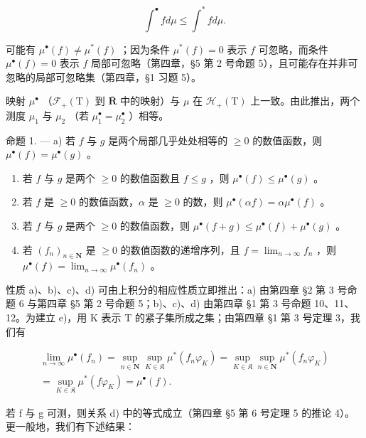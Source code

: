 \[
\int^ {\bullet} f d \mu \leqslant \int^ {*} f d \mu .\tag{1}
\]

可能有 \(\mu^{\bullet}(f) \neq \mu^{*}(f)\) ；因为条件 \(\mu^{*}(f) = 0\) 表示 \(f\) 可忽略，而条件 \(\mu^{\bullet}(f) = 0\) 表示 \(f\) 局部可忽略（第四章，§5 第 2 号命题 5），且可能存在并非可忽略的局部可忽略集（第四章，§1 习题 5）。

映射 \(\mu^{\bullet}\) （\(\mathcal{F}_{+}(\mathrm{T})\) 到 \(\overline{\mathbf{R}}\) 中的映射）与 \(\mu\) 在 \(\mathcal{H}_{+}(\mathrm{T})\) 上一致。由此推出，两个测度 \(\mu_{1}\) 与 \(\mu_{2}\) （若 \(\mu_{1}^{\bullet} = \mu_{2}^{\bullet}\) ）相等。

命题 1. --- a) 若 \(f\) 与 \(g\) 是两个局部几乎处处相等的 \(\geqslant 0\) 的数值函数，则 \(\mu^{\bullet}(f) = \mu^{\bullet}(g)\) 。

\begin{enumerate}
\def\labelenumi{\alph{enumi})}
\setcounter{enumi}{1}
\item
  若 \(f\) 与 \(g\) 是两个 \(\geqslant 0\) 的数值函数且 \(f \leqslant g\) ，则 \(\mu^{\bullet}(f) \leqslant \mu^{\bullet}(g)\) 。
\item
  若 \(f\) 是 \(\geqslant 0\) 的数值函数，\(\alpha\) 是 \(\geqslant 0\) 的数，则 \(\mu^{\bullet}(\alpha f) = \alpha \mu^{\bullet}(f)\) 。
\item
  若 \(f\) 与 \(g\) 是两个 \(\geqslant 0\) 的数值函数，则 \(\mu^{\bullet}(f + g) \leqslant \mu^{\bullet}(f) + \mu^{\bullet}(g)\) 。
\item
  若 \((f_n)_{n\in \mathbf{N}}\) 是 \(\geqslant 0\) 的数值函数的递增序列，且 \(f = \lim_{n\to \infty}f_n\) ，则 \(\mu^{\bullet}(f) = \lim_{n\to \infty}\mu^{\bullet}(f_n)\) 。
\end{enumerate}

性质 a)、b)、c)、d) 可由上积分的相应性质立即推出：a) 由第四章 §2 第 3 号命题 6 与第四章 §5 第 2 号命题 5；b)、c)、d) 由第四章 §1 第 3 号命题 10、11、12。为建立 e)，用 K 表示 T 的紧子集所成之集；由第四章 §1 第 3 号定理 3，我们有

\[
\begin{array}{c} \lim _ {n \to \infty} \mu^ {\bullet} (f _ {n}) = \sup _ {n \in \mathbf {N}} \sup _ {K \in \mathfrak {K}} \mu^ {*} (f _ {n} \varphi_ {K}) = \sup _ {K \in \mathfrak {K}} \sup _ {n \in \mathbf {N}} \mu^ {*} (f _ {n} \varphi_ {K}) \\ = \sup _ {K \in \mathfrak {K}} \mu^ {*} (f \varphi_ {K}) = \mu^ {\bullet} (f)  . \end{array}
\]

若 f 与 g 可测，则关系 d) 中的等式成立（第四章 §5 第 6 号定理 5 的推论 4）。更一般地，我们有下述结果：

